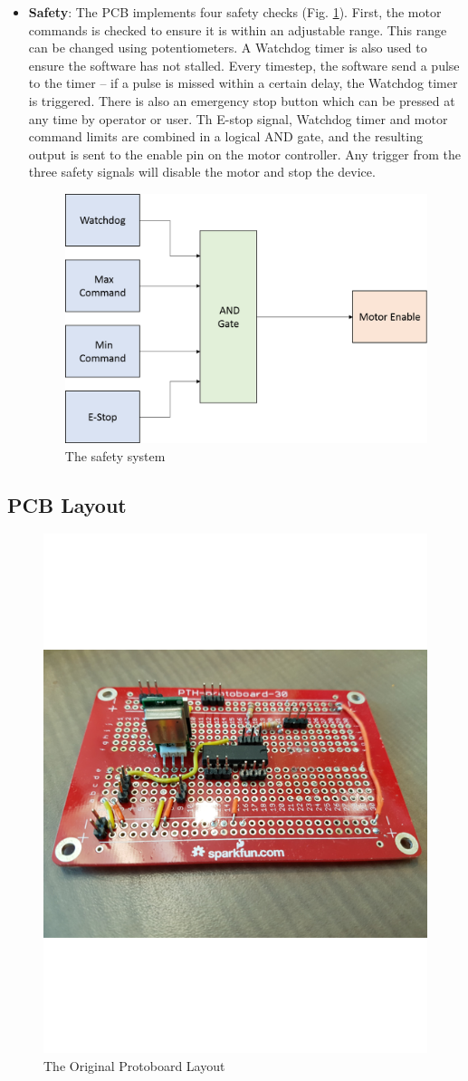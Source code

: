 \documentclass[12pt]{report}
\begin{document}
\begin{itemize}
	\item \textbf{Safety}: The PCB implements four safety checks (Fig. \ref{fig:safety}). First, the motor commands is checked to ensure it is within an adjustable range. This range can be changed using potentiometers. A Watchdog timer is also used to ensure the software has not stalled. Every timestep, the software send a pulse to the timer -- if a pulse is missed within a certain delay, the Watchdog timer is triggered. There is also an emergency stop button which can be pressed at any time by operator or user. Th E-stop signal, Watchdog timer and motor command limits are combined in a logical AND gate, and the resulting output is sent to the enable pin on the motor controller. Any trigger from the three safety signals will disable the motor and stop the device.

	\begin{figure}[h] 
		\centering
		\includegraphics[width=0.6\linewidth]{electronics_safety}
		\caption{The safety system}
		\label{fig:safety}
	\end{figure}	
	 
	\end{itemize}

		
		\subsection{PCB Layout}
		
	\begin{figure}[h] 
		\centering
		\includegraphics[width=0.6\linewidth]{protoboard}
		\caption{The Original Protoboard Layout}
		\label{fig:protoboard}
	\end{figure}		
		
\end{document}

